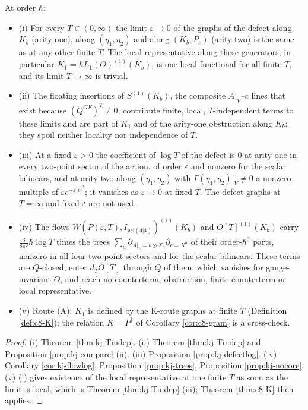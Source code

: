 \begin{theorem}
\label{thm:kj-verdict}
At order $\hbar$:
\begin{itemize}
\item (i) For every $T\in(0,\infty)$ the limit $\varepsilon\to0$ of the graphs of the defect along $K_b$ (arity one), along $(\eta_1,\eta_2)$ and along $(K_b,P_c)$ (arity two) is the same as at any other finite $T$. The local representative along these generators, in particular $K_1=\hbar L_1(O)^{(1)}(K_b)$, is one local functional for all finite $T$, and its limit $T\to\infty$ is trivial.
\item (ii) The floating insertions of $S^{(1)}(K_b)$, the composite $A|_V$--$c$ lines that exist because $(Q^{GF})^2\neq0$, contribute finite, local, $T$-independent terms to these limits and are part of $K_1$ and of the arity-one obstruction along $K_b$; they spoil neither locality nor independence of $T$.
\item (iii) At a fixed $\varepsilon>0$ the coefficient of $\log T$ of the defect is $0$ at arity one in every two-point sector of the action, of order $\varepsilon$ and nonzero for the scalar bilinears, and at arity two along $(\eta_1,\eta_2)$ with $\Gamma(\eta_1,\eta_2)|_V\neq0$ a nonzero multiple of $\varepsilon e^{-\varepsilon|p|^2}$; it vanishes as $\varepsilon\to0$ at fixed $T$. The defect graphs at $T=\infty$ and fixed $\varepsilon$ are not used.
\item (iv) The flows $W(P(\varepsilon,T),I_{\mathfrak{psl}(4|4)})^{(1)}(K_b)$ and $O[T]^{(1)}(K_b)$ carry $\tfrac{3}{8\pi^2}\hbar\log T$ times the trees $\sum_a\partial_{A|_V=b\otimes X_a}\partial_{c=X^a}$ of their order-$\hbar^0$ parts, nonzero in all four two-point sectors and for the scalar bilinears. These terms are $Q$-closed, enter $d_TO[T]$ through $Q$ of them, which vanishes for gauge-invariant $O$, and reach no counterterm, obstruction, finite counterterm or local representative.
\item (v) Route (A): $K_1$ is defined by the K-route graphs at finite $T$ (Definition \ref{def:c8-K}); the relation $K=P^\dagger$ of Corollary \ref{cor:c8-gram} is a cross-check.
\end{itemize}
\end{theorem}

\begin{proof}
(i) Theorem \ref{thm:kj-Tindep}. (ii) Theorem \ref{thm:kj-Tindep} and Proposition \ref{prop:kj-compare} (ii). (iii) Proposition \ref{prop:kj-defectlog}. (iv) Corollary \ref{cor:kj-flowlog}, Proposition \ref{prop:kj-trees}, Proposition \ref{prop:kj-nocore}. (v) (i) gives existence of the local representative at one finite $T$ as soon as the limit is local, which is Theorem \ref{thm:kj-Tindep} (iii); Theorem \ref{thm:c8-K} then applies.
\end{proof}

